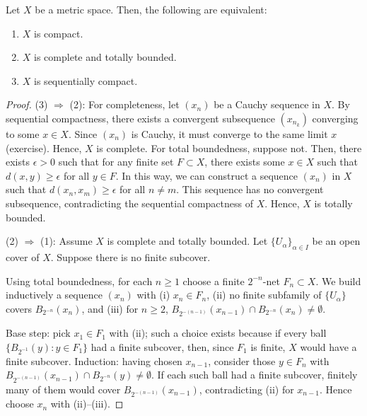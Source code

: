 \begin{theorem}
Let $X$ be a metric space. Then, the following are equivalent:
\begin{enumerate}
    \item $X$ is compact.
    \item $X$ is complete and totally bounded.
    \item $X$ is sequentially compact.
\end{enumerate}
\end{theorem}
\begin{proof}
   
    (3) \(\Rightarrow\) (2): For completeness, let \((x_n)\) be a Cauchy sequence in \(X\). By sequential compactness, there exists a convergent subsequence \((x_{n_k})\) converging to some \(x \in X\). Since \((x_n)\) is Cauchy, it must converge to the same limit \(x\) (exercise). Hence, \(X\) is complete. For total boundedness, suppose not. Then, there exists \(\epsilon > 0\) such that for any finite set \(F \subset X\), there exists some \(x \in X\) such that \(d(x,y) \geq \epsilon\) for all \(y \in F\). In this way, we can construct a sequence \((x_n)\) in \(X\) such that \(d(x_n, x_m) \geq \epsilon\) for all \(n \neq m\). This sequence has no convergent subsequence, contradicting the sequential compactness of \(X\). Hence, \(X\) is totally bounded.

    (2) \(\Rightarrow\) (1): Assume \(X\) is complete and totally bounded. Let \(\{U_\alpha\}_{\alpha\in I}\) be an open cover of \(X\).
    Suppose there is no finite subcover.

    Using total boundedness, for each \(n\ge1\) choose a finite \(2^{-n}\)-net \(F_n\subset X\).
    We build inductively a sequence \((x_n)\) with
    (i) \(x_n\in F_n\),
    (ii) no finite subfamily of \(\{U_\alpha\}\) covers \(B_{2^{-n}}(x_n)\), and
    (iii) for \(n\ge2\), \(B_{2^{-(n-1)}}(x_{n-1})\cap B_{2^{-n}}(x_n)\neq\emptyset\).

    Base step: pick \(x_1\in F_1\) with (ii); such a choice exists because if every ball
    \(\{B_{2^{-1}}(y):y\in F_1\}\) had a finite subcover, then, since \(F_1\) is finite, \(X\) would have a finite subcover.
    Induction: having chosen \(x_{n-1}\), consider those \(y\in F_n\) with
    \(B_{2^{-(n-1)}}(x_{n-1})\cap B_{2^{-n}}(y)\neq\emptyset\).
    If each such ball had a finite subcover, finitely many of them would cover
    \(B_{2^{-(n-1)}}(x_{n-1})\), contradicting (ii) for \(x_{n-1}\). Hence choose \(x_n\) with (ii)–(iii).


\end{proof}
